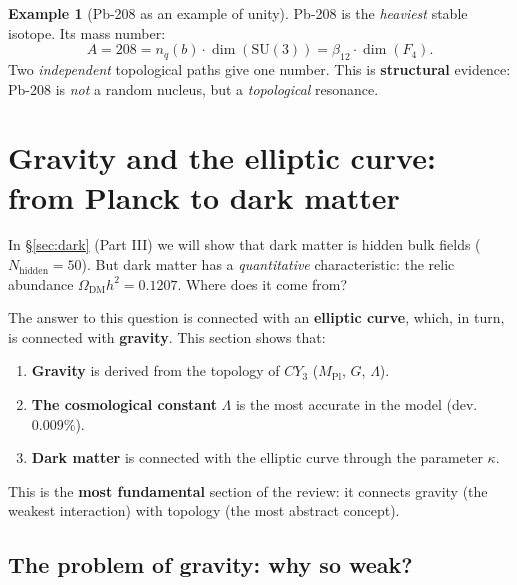 \documentclass[11pt,a4paper]{article}
\newcommand{\SU}{\mathrm{SU}}
\newcommand{\CY}{CY_3}
\newcommand{\Nhidden}{N_{\text{hidden}}}
\newcommand{\Mpl}{M_{\text{Pl}}}
\theoremstyle{definition}
\newtheorem{example}[theorem]{Example}
\begin{document}
\begin{example}[Pb-208 as an example of unity]
\label{ex:pb208}
Pb-208 is the \emph{heaviest} stable isotope. Its mass 
number:
\begin{equation}
    A = 208 = n_q(b) \cdot \dim(\SU(3)) 
    = \beta_{12} \cdot \dim(F_4).
\end{equation}
Two \emph{independent} topological paths give one number. 
This is \textbf{structural} evidence: Pb-208 is \emph{not} 
a random nucleus, but a \emph{topological} resonance.
\end{example}

\section{Gravity and the elliptic curve: from Planck to dark matter}
\label{sec:gravity}

In §\ref{sec:dark} (Part III) we will show that dark matter is 
hidden bulk fields ($\Nhidden = 50$). But dark matter has a 
\emph{quantitative} characteristic: the relic abundance 
$\Omega_{\text{DM}} h^2 = 0.1207$. Where does it come from?

The answer to this question is connected with an \textbf{elliptic curve}, 
which, in turn, is connected with \textbf{gravity}. 
This section shows that:

\begin{enumerate}
    \item \textbf{Gravity} is derived from the topology of $\CY$ 
          ($\Mpl$, $G$, $\Lambda$).
    \item \textbf{The cosmological constant} $\Lambda$ is the most accurate 
          in the model (dev. $0.009\%$).
    \item \textbf{Dark matter} is connected with the elliptic curve 
          through the parameter $\kappa$.
\end{enumerate}

This is the \textbf{most fundamental} section of the review: it connects 
gravity (the weakest interaction) with topology 
(the most abstract concept).

\subsection{The problem of gravity: why so weak?}
\label{subsec:gravity-problem}
\end{document}
